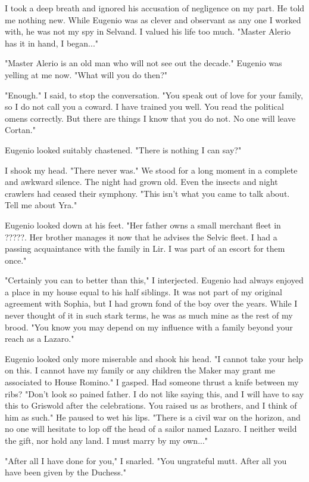 \documentclass{article}
\begin{document}
I took a deep breath and ignored his accusation of negligence on my part. He told me nothing new. While Eugenio was as clever and observant as any one I worked with, he was not my spy in Selvand. I valued his life too much. "Master Alerio has it in hand, I began..."

"Master Alerio is an old man who will not see out the decade." Eugenio was yelling at me now. "What will you do then?"

"Enough." I said, to stop the conversation. "You speak out of love for your family, so I do not call you a coward. I have trained you well. You read the political omens correctly. But there are things I know that you do not. No one will leave Cortan."

Eugenio looked suitably chastened. "There is nothing I can say?"

I shook my head. "There never was." We stood for a long moment in a complete and awkward silence. The night had grown old. Even the insects and night crawlers had ceased their symphony. "This isn't what you came to talk about. Tell me about Yra."

Eugenio looked down at his feet. "Her father owns a small merchant fleet in ?????. Her brother manages it now that he advises the Selvic fleet. I had a passing acquaintance with the family in Lir. I was part of an escort for them once."

"Certainly you can to better than this," I interjected. Eugenio had always enjoyed a place in my house equal to his half siblings. It was not part of my original agreement with Sophia, but I had grown fond of the boy over the years. While I never thought of it in such stark terms, he was as much mine as the rest of my brood. "You know you may depend on my influence with a family beyond your reach as a Lazaro."

Eugenio looked only more miserable and shook his head. "I cannot take your help on this. I cannot have my family or any children the Maker may grant me associated to House Romino." I gasped. Had someone thrust a knife between my ribs? "Don't look so pained father. I do not like saying this, and I will have to say this to Griswold after the celebrations. You raised us as brothers, and I think of him as such." He paused to wet his lips. "There is a civil war on the horizon, and no one will hesitate to lop off the head of a sailor named Lazaro. I neither weild the gift, nor hold any land. I must marry by my own..."

"After all I have done for you," I snarled. "You ungrateful mutt. After all you have been given by the Duchess."
\end{document}
